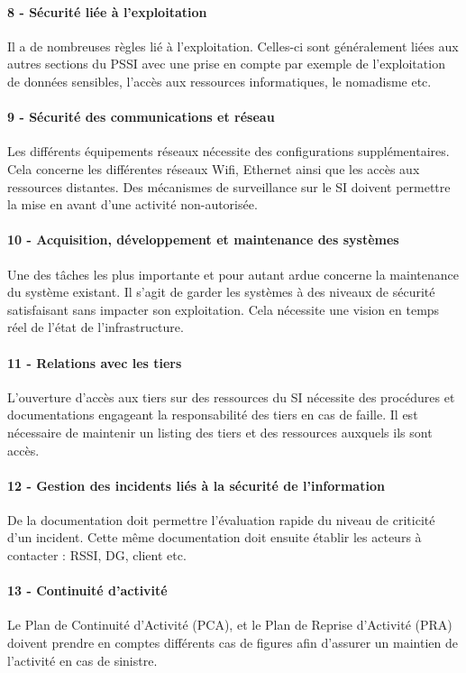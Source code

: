 \documentclass[12pt]{article}
\begin{document}
\paragraph{8 - Sécurité liée à l'exploitation} 
Il a de nombreuses règles lié à l'exploitation. 
Celles-ci sont généralement liées aux autres sections du PSSI avec une prise en compte par exemple de l'exploitation de données sensibles, l'accès aux ressources informatiques, le nomadisme etc.
\paragraph{9 - Sécurité des communications et réseau} 
Les différents équipements réseaux nécessite des configurations supplémentaires. 
Cela concerne les différentes réseaux Wifi, Ethernet ainsi que les accès aux ressources distantes. 
Des mécanismes de surveillance sur le SI doivent permettre la mise en avant d'une activité non-autorisée.
\paragraph{10 - Acquisition, développement et maintenance des systèmes} 
Une des tâches les plus importante et pour autant ardue concerne la maintenance du système existant. 
Il s'agit de garder les systèmes à des niveaux de sécurité satisfaisant sans impacter son exploitation. 
Cela nécessite une vision en temps réel de l'état de l'infrastructure.
\paragraph{11 - Relations avec les tiers} 
L'ouverture d'accès aux tiers sur des ressources du SI nécessite des procédures et documentations engageant la responsabilité des tiers en cas de faille. 
Il est nécessaire de maintenir un listing des tiers et des ressources auxquels ils sont accès.
\paragraph{12 - Gestion des incidents liés à la sécurité de l'information} De la documentation doit permettre l'évaluation rapide du niveau de criticité d'un incident. 
Cette même documentation doit ensuite établir les acteurs à contacter : RSSI, DG, client etc.
\paragraph{13 - Continuité d'activité} 
Le Plan de Continuité d'Activité (PCA), et le Plan de Reprise d'Activité (PRA) doivent prendre en comptes différents cas de figures afin d'assurer un maintien de l'activité en cas de sinistre.
\end{document}

